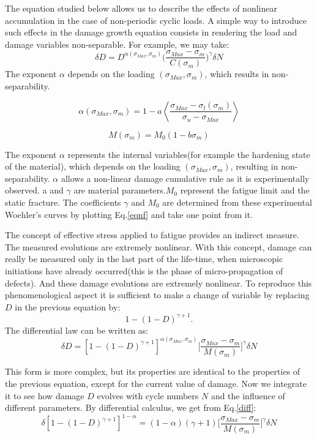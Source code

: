 \documentclass[3p,times,procedia,number]{elsarticle}
\begin{document}
The equation studied below allows us to describe the effects of nonlinear accumulation in the case of non-periodic cyclic loads\cite{FFE:FFE1}. A simple way to introduce such effects in the damage growth equation consists in rendering the load and damage variables non-separable. For example, we may take:
$$\delta D=D^{\alpha(\sigma_{Max},\sigma_m)}\big(\frac{\sigma_{Max}-\sigma_m}{C(\sigma_m)}\big)^\gamma\delta N$$
The exponent $\alpha$ depends on the loading $(\sigma_{Max},\sigma_m)$, which results in non-separability.

\vspace{6pt}
$$\alpha(\sigma_{Max},\sigma_m)=1-a\left\langle\dfrac{\sigma_{Max}-\sigma_l(\sigma_m)}{\sigma_u-\sigma_{Max}}\right\rangle$$
\vspace{6pt}

$$ M(\sigma_m)=M_0(1-b\sigma_m)$$ 
\vspace{6pt}

The exponent $\alpha$ represents the internal variables(for example the hardening state of the material), which depends on the loading $(\sigma_{Max},\sigma_m)$, resulting in non-separability. $\alpha$  allows a non-linear damage cumulative rule as it is experimentally observed. a and $\gamma$ are material parameters.$M_0$ represent the fatigue limit and the static fracture. The coefficients $\gamma$ and $M_0$ are determined from these experimental Woehler's curves by plotting Eq.\eqref{eqnf} and take one point from it. 

The concept of effective stress applied to fatigue provides an indirect measure. The measured evolutions are extremely nonlinear. With this concept, damage can really be measured only in the last part of the life-time, when microscopic initiations have already occurred(this is the phase of micro-propagation of defects). And these damage evolutions are extremely nonlinear. To reproduce this phenomenological aspect it is sufficient to make a change of variable by replacing $D$ in the previous equation by:
$$1-(1-D)^{\gamma+1}.$$
The differential law can be written as:
\begin{equation}\delta D=[1-(1-D)^{\gamma+1}]^{\alpha(\sigma_{Max},\sigma_m)}\big[\frac{\sigma_{Max}-\sigma_m}{M(\sigma_m)}\big]^\gamma\delta N
\label{diff}
\end{equation}

This form is more complex, but its properties are identical to the properties of the previous equation, except for the current value of damage. Now we integrate it to see how damage $D$ evolves with cycle numbers $N$ and the influence of different parameters. By differential calculus, we get from Eq.\eqref{diff}:
\begin{equation}\delta [1-(1-D)^{\gamma+1}]^{1-\alpha}=(1-\alpha)(\gamma+1)\big[\frac{\sigma_{Max}-\sigma_m}{M(\sigma_m)}\big]^\gamma\delta N
\label{easyintegration}
\end{equation}
\end{document}
